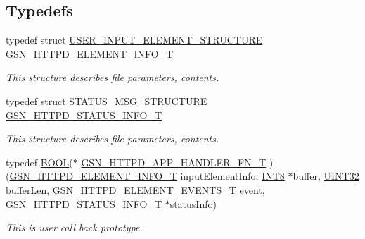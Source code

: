 \subsection*{Typedefs}
\begin{DoxyCompactItemize}
\item 
typedef struct \hyperlink{a00463}{USER\_\-INPUT\_\-ELEMENT\_\-STRUCTURE} \hyperlink{a00511_a43b1190102f272453bf5f9e12fae8565}{GSN\_\-HTTPD\_\-ELEMENT\_\-INFO\_\-T}
\begin{DoxyCompactList}\small\item\em This structure describes file parameters, contents. \end{DoxyCompactList}\item 
typedef struct \hyperlink{a00461}{STATUS\_\-MSG\_\-STRUCTURE} \hyperlink{a00511_a7104dada96f24f3d0e996e3a8ad59b19}{GSN\_\-HTTPD\_\-STATUS\_\-INFO\_\-T}
\begin{DoxyCompactList}\small\item\em This structure describes file parameters, contents. \end{DoxyCompactList}\item 
typedef \hyperlink{a00660_ga1f04022c0a182c51c059438790ea138c}{BOOL}($\ast$ \hyperlink{a00511_aa8074d4aaa1ef8e6443148ee81fd9aea}{GSN\_\-HTTPD\_\-APP\_\-HANDLER\_\-FN\_\-T} )(\hyperlink{a00463}{GSN\_\-HTTPD\_\-ELEMENT\_\-INFO\_\-T} inputElementInfo, \hyperlink{a00660_ga307b8734c020247f6bac4fcde0dcfbb9}{INT8} $\ast$buffer, \hyperlink{a00660_gae1e6edbbc26d6fbc71a90190d0266018}{UINT32} bufferLen, \hyperlink{a00511_a08d46f405dab1ea7ad33b522e3604839}{GSN\_\-HTTPD\_\-ELEMENT\_\-EVENTS\_\-T} event, \hyperlink{a00461}{GSN\_\-HTTPD\_\-STATUS\_\-INFO\_\-T} $\ast$statusInfo)
\begin{DoxyCompactList}\small\item\em This is user call back prototype. \end{DoxyCompactList}\end{DoxyCompactItemize}
